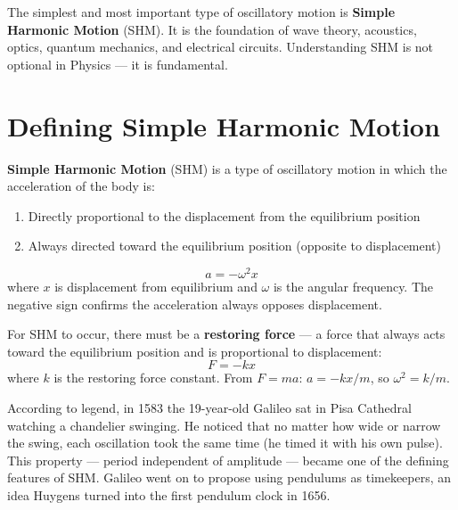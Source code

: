 The simplest and most important type of oscillatory
motion is \textbf{Simple Harmonic Motion} (SHM). It is
the foundation of wave theory, acoustics, optics,
quantum mechanics, and electrical circuits. Understanding
SHM is not optional in Physics --- it is fundamental.

\section{Defining Simple Harmonic Motion}

\begin{definitionbox}
\textbf{Simple Harmonic Motion} (SHM) is a type of
oscillatory motion in which the acceleration of the
body is:
\begin{enumerate}[noitemsep]
  \item Directly proportional to the displacement
  from the equilibrium position
  \item Always directed toward the equilibrium
  position (opposite to displacement)
\end{enumerate}
\[
  a = -\omega^2 x
\]
where $x$ is displacement from equilibrium and
$\omega$ is the angular frequency. The negative sign
confirms the acceleration always opposes displacement.
\end{definitionbox}

\begin{keybox}
For SHM to occur, there must be a \textbf{restoring force}
--- a force that always acts toward the equilibrium
position and is proportional to displacement:
\[
  F = -kx
\]
where $k$ is the restoring force constant. From
$F = ma$: $a = -kx/m$, so $\omega^2 = k/m$.
\end{keybox}

\begin{historybox}
According to legend, in 1583 the 19-year-old Galileo
sat in Pisa Cathedral watching a chandelier swinging.
He noticed that no matter how wide or narrow the swing,
each oscillation took the same time (he timed it with
his own pulse). This property --- period independent
of amplitude --- became one of the defining features
of SHM. Galileo went on to propose using pendulums
as timekeepers, an idea Huygens turned into the first
pendulum clock in 1656.
\end{historybox}

